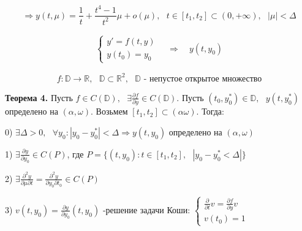 \documentclass[12pt, a4paper]{report}
\begin{document}
\[ \Rightarrow y (t ,\mu ) = \frac{1}{t } + \frac{ t ^ 4 - 1 }{t ^2 } \mu + o(\mu ) , \text{ }  t \in  [t_1 ,t_2 ] \subset (0, + \infty  ) , \text{ }  |\mu     |< \Delta   \] 

\[ \begin{aligned}
    \begin{cases}
        y ' = f(t, y ) \\ 
        y(t_0 )= y_0 
        \end{cases} 
        \quad \Rightarrow \quad  y (t, y_0 )
\end{aligned} \] 

\[ f: \mathbb{D} \to  \mathbb{R} , \text{ }  \mathbb{D} \subset \mathbb{R} ^2 , \text{ }  \mathbb{D} \text{  - непустое открытое множество}  \] 

\begin{flushleft}
    \textbf{Теорема 4.} Пусть \( f \in  C (\mathbb{D} ) , \text{ } \exists \frac{\partial  f }{\partial  y } \in  C(\mathbb{D} )   \). Пусть \( (t_0 , y_0 ^* ) \in  \mathbb{D} , \text{  } y(t ,y_0^* ) \) определено на \( (\alpha , \omega ) \). Возьмем \( [t_1,t_2 ] \subset (\alpha \omega ) \). Тогда: 
    
    0) \( \exists  \Delta > 0 , \text{ } \forall  y_0 : |y_0 - y_0 ^* | < \Delta \Rightarrow y(t, y_0 )  \)  определено на \( (\alpha , \omega) \) 

    1) \( \exists \frac{\partial  y }{\partial  y_0 } \in  C (P )  \), где \( P = \{(t, y_0 ): t \in  [t_1 ,t_2 ] , \text{ } |y_0 - y_0 ^* < \Delta|\} \)  

    2) \( \exists  \frac{\partial  ^2 y }{\partial  \mu \partial  t }  = \frac{\partial  ^2 y }{\partial  y_0 \partial  t_0 } \in C(P) \) 

    3) \( v(t, y_0 ) = \frac{\partial  y }{\partial  y_0 } (t,y_0 )   \)  -решение задачи Коши: \( \begin{cases}
    \displaystyle \frac{\partial  }{\partial  t }v = \frac{\partial  f }{\partial  y } v  \\ 
    v (t_0 ) =1   
    \end{cases} \)
\end{flushleft}






\ifdefined\mainfile
\else
    
\end{document}
